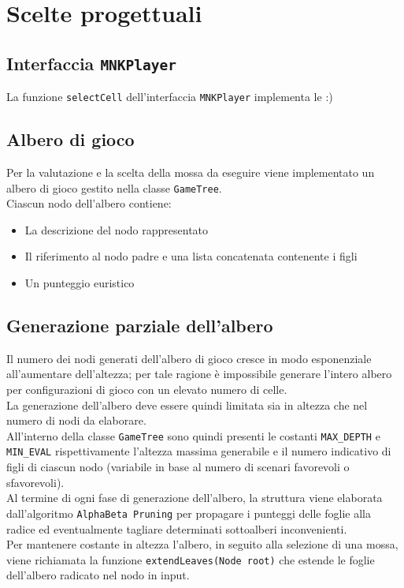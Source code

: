 \documentclass[11pt]{article}
\begin{document}
\section{Scelte progettuali}
\subsection{Interfaccia \texttt{MNKPlayer}}
La funzione \texttt{selectCell} dell'interfaccia \texttt{MNKPlayer} implementa le :)
\subsection{Albero di gioco}
Per la valutazione e la scelta della mossa da eseguire viene implementato un albero di gioco gestito nella classe \texttt{GameTree}.\\
Ciascun nodo dell'albero contiene:
\begin{itemize}		%
	\item La descrizione del nodo rappresentato
	\item Il riferimento al nodo padre e una lista concatenata contenente i figli
	\item Un punteggio euristico
\end{itemize}

\subsection{Generazione parziale dell'albero}
Il numero dei nodi generati dell'albero di gioco cresce in modo esponenziale all'aumentare dell'altezza;
per tale ragione è impossibile generare l'intero albero per configurazioni di gioco con un elevato numero di celle.\\
La generazione dell'albero deve essere quindi limitata sia in altezza che nel numero di nodi da elaborare.\\
All'interno della classe \texttt{GameTree} sono quindi presenti le costanti \texttt{MAX\_DEPTH} e \texttt{MIN\_EVAL} rispettivamente l'altezza massima generabile e il numero indicativo di figli di ciascun nodo (variabile in base al numero di scenari favorevoli o sfavorevoli).\\
Al termine di ogni fase di generazione dell'albero, la struttura viene elaborata dall'algoritmo \texttt{AlphaBeta Pruning} per propagare i punteggi delle foglie alla radice ed eventualmente tagliare determinati sottoalberi inconvenienti.\\
Per mantenere costante in altezza l'albero, in seguito alla selezione di una mossa, viene richiamata la funzione \texttt{extendLeaves(Node root)} che estende le foglie dell'albero radicato nel nodo in input.
\end{document}
